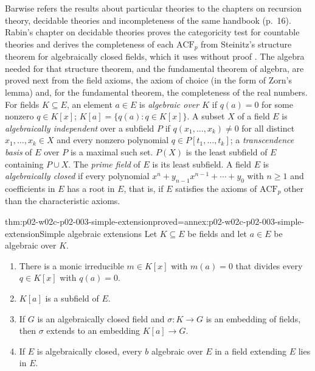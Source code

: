 Barwise refers the results about particular theories to the chapters on
recursion theory, decidable theories and incompleteness of the same
handbook (p.~16).  Rabin's chapter on decidable theories proves the
categoricity test for countable theories
\cite[\S2, 2.1, Theorem~4, p.~608]{Rabin1977Decidable}
and derives the completeness of each \(\mathrm{ACF}_p\) from Steinitz's
structure theorem for algebraically closed fields, which it uses without
proof \cite[\S2, 2.2, p.~609]{Rabin1977Decidable}.  The
algebra needed for that structure theorem, and the fundamental theorem of
algebra, are proved next from the field axioms, the axiom of choice (in
the form of Zorn's lemma) and, for the fundamental theorem, the
completeness of the real numbers.  For fields \(K\subseteq E\), an element
\(a\in E\) is \emph{algebraic over \(K\)} if \(q(a)=0\) for some nonzero
\(q\in K[x]\); \(K[a]=\{q(a):q\in K[x]\}\).  A subset \(X\) of a field
\(E\) is \emph{algebraically independent} over a subfield \(P\) if
\(q(x_1,\ldots,x_k)\neq0\) for all distinct \(x_1,\ldots,x_k\in X\) and
every nonzero polynomial \(q\in P[t_1,\ldots,t_k]\); a \emph{transcendence
basis} of \(E\) over \(P\) is a maximal such set.  \(P(X)\) is the least
subfield of \(E\) containing \(P\cup X\).  The \emph{prime field} of
\(E\) is its least subfield.  A field \(E\) is \emph{algebraically
closed} if every polynomial \(x^n+y_{n-1}x^{n-1}+\cdots+y_0\) with
\(n\geq1\) and coefficients in \(E\) has a root in \(E\), that is, if
\(E\) satisfies the axioms of \(\mathrm{ACF}_p\) other than the
characteristic axioms.

\begin{hblemma}{thm:p02-w02c-p02-003-simple-extension}{proved=annex:p02-w02c-p02-003-simple-extension}{Simple algebraic extensions}
Let \(K\subseteq E\) be fields and let \(a\in E\) be algebraic over \(K\).
\begin{enumerate}
\item There is a monic irreducible \(m\in K[x]\) with \(m(a)=0\) that
      divides every \(q\in K[x]\) with \(q(a)=0\).
\item \(K[a]\) is a subfield of \(E\).
\item If \(G\) is an algebraically closed field and \(\sigma\colon K\to G\)
      is an embedding of fields, then \(\sigma\) extends to an embedding
      \(K[a]\to G\).
\item If \(E\) is algebraically closed, every \(b\) algebraic over \(E\) in
      a field extending \(E\) lies in \(E\).
\end{enumerate}
\end{hblemma}


